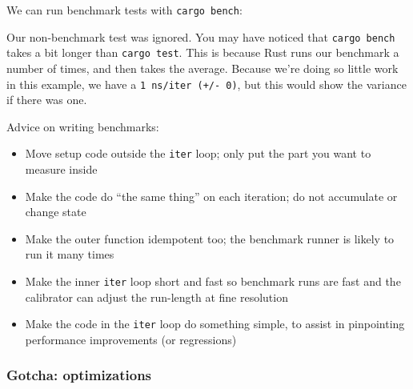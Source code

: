\documentclass[a4paper,]{book}
\newenvironment{Shaded}{\begin{snugshade}}{\end{snugshade}}
\newcommand{\KeywordTok}[1]{\textcolor[rgb]{0.13,0.29,0.53}{\textbf{{#1}}}}
\newcommand{\NormalTok}[1]{{#1}}
\providecommand{\tightlist}{%
  \setlength{\itemsep}{0pt}\setlength{\parskip}{0pt}}
\begin{document}
We can run benchmark tests with \texttt{cargo\ bench}:

\begin{Shaded}
\end{Shaded}

Our non-benchmark test was ignored. You may have noticed that
\texttt{cargo\ bench} takes a bit longer than \texttt{cargo\ test}. This
is because Rust runs our benchmark a number of times, and then takes the
average. Because we're doing so little work in this example, we have a
\texttt{1\ ns/iter\ (+/-\ 0)}, but this would show the variance if there
was one.

Advice on writing benchmarks:

\begin{itemize}
\tightlist
\item
  Move setup code outside the \texttt{iter} loop; only put the part you
  want to measure inside
\item
  Make the code do ``the same thing'' on each iteration; do not
  accumulate or change state
\item
  Make the outer function idempotent too; the benchmark runner is likely
  to run it many times
\item
  Make the inner \texttt{iter} loop short and fast so benchmark runs are
  fast and the calibrator can adjust the run-length at fine resolution
\item
  Make the code in the \texttt{iter} loop do something simple, to assist
  in pinpointing performance improvements (or regressions)
\end{itemize}

\subsubsection{Gotcha: optimizations}\label{gotcha-optimizations}
\end{document}
